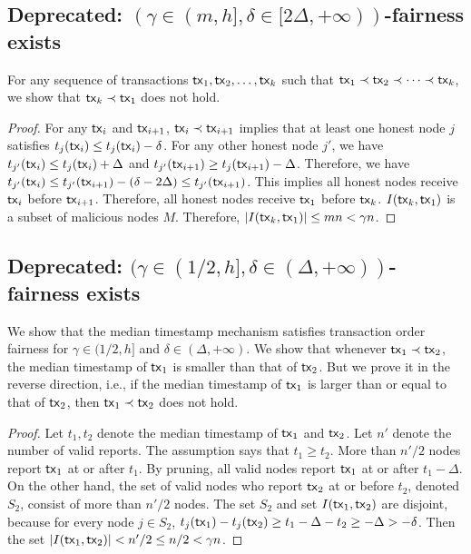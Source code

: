 \documentclass[runningheads]{llncs}
\begin{document}
\subsection{Deprecated: $(\gamma\in(m,h], \delta\in[2\Delta,+\infty))$-fairness exists}

For any sequence of transactions $\mathsf{tx}_1, \mathsf{tx}_2, \dots, \mathsf{tx}_k$ such that $\mathsf{tx}_1\prec \mathsf{tx}_2\prec \cdots \prec \mathsf{tx}_k$, we show that $\mathsf{tx}_k \prec \mathsf{tx}_1$ does not hold. 
\begin{proof}
For any $\mathsf{tx}_i$ and $\mathsf{tx}_{i+1}$, $\mathsf{tx}_i\prec \mathsf{tx}_{i+1}$ implies that at least one honest node $j$ satisfies $t_j(\mathsf{tx}_{i}) \le t_j(\mathsf{tx}_{i}) - \delta$. For any other honest node $j'$, we have $t_{j'}(\mathsf{tx}_{i}) \le t_j(\mathsf{tx}_{i}) + \Delta$ and $t_{j'}(\mathsf{tx}_{i+1}) \ge t_j(\mathsf{tx}_{i+1}) - \Delta$. Therefore, we have $t_{j'}(\mathsf{tx}_i) \le t_{j'}(\mathsf{tx}_{i+1}) - (\delta - 2\Delta) \le t_{j'}(\mathsf{tx}_{i+1})$. This implies all honest nodes receive $\mathsf{tx}_{i}$ before $\mathsf{tx}_{i+1}$. Therefore, all honest nodes receive $\mathsf{tx}_{1}$ before $\mathsf{tx}_{k}$. $I(\mathsf{tx}_{k}, \mathsf{tx}_{1})$ is a subset of malicious nodes $M$. Therefore, $|I(\mathsf{tx}_{k}, \mathsf{tx}_{1})|\le mn < \gamma n$. 
\end{proof} 


\subsection{Deprecated: $(\gamma\in(1/2,h], \delta\in(\Delta,+\infty))$-fairness exists}
We show that the median timestamp mechanism satisfies transaction order fairness for $\gamma\in(1/2,h]$ and $\delta\in(\Delta,+\infty)$. We show that whenever $\mathsf{tx}_1\prec \mathsf{tx}_2$, the median timestamp of $\mathsf{tx}_1$ is smaller than that of $\mathsf{tx}_2$. But we prove it in the reverse direction, i.e., if the median timestamp of $\mathsf{tx}_1$ is larger than or equal to that of $\mathsf{tx}_2$, then $\mathsf{tx}_1\prec \mathsf{tx}_2$ does not hold. 

\begin{proof}
    Let $t_1, t_2$ denote the median timestamp of $\mathsf{tx}_1$ and $\mathsf{tx}_2$. Let $n'$ denote the number of valid reports. The assumption says that $t_1\ge t_2$. More than $n'/2$ nodes report $\mathsf{tx}_1$ at or after $t_1$. By pruning, all valid nodes report $\mathsf{tx}_1$ at or after $t_1-\Delta$. On the other hand, the set of valid nodes who report $\mathsf{tx}_2$ at or before $t_2$, denoted $S_2$, consist of more than $n'/2$ nodes. The set $S_2$ and set $I(\mathsf{tx}_1, \mathsf{tx}_2)$ are disjoint, because for every node $j\in S_2$, $t_j(\mathsf{tx}_1) - t_j(\mathsf{tx}_2)\ge t_1 - \Delta -t_2 \ge -\Delta > -\delta$. Then the set $|I(\mathsf{tx}_1,\mathsf{tx}_2)| < n'/2 \le n/2 < \gamma n$.   
\end{proof}
\end{document}
